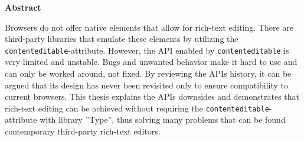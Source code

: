 \thispagestyle{empty}
\noindent \textbf{Abstract}

\noindent Browsers do not offer native elements that allow for rich-text editing. There are third-party libraries that emulate these elements by utilizing the \texttt{contenteditable}-attribute. However, the API enabled by \texttt{contenteditable} is very limited and unstable. Bugs and unwanted behavior make it hard to use and can only be worked around, not fixed. By reviewing the APIs history, it can be argued that its design has never been revisited only to ensure compatibility to current browsers. This thesis explains the APIs downsides and demonstrates that rich-text editing can be achieved without requiring the \texttt{contenteditable}-attribute with library ''Type'', thus solving many problems that can be found contemporary third-party rich-text editors.